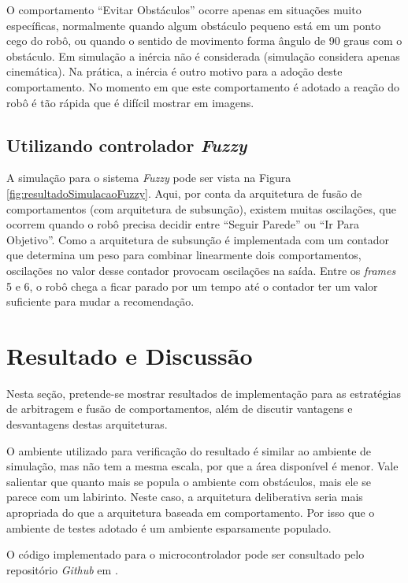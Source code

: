	O comportamento ``Evitar Obstáculos'' ocorre apenas em situações muito específicas, normalmente quando algum 
	obstáculo pequeno está em um ponto cego do robô, ou quando o sentido de movimento forma ângulo de 90 graus com
	o obstáculo. Em simulação a inércia não é considerada (simulação considera apenas cinemática). Na prática, a 
	inércia é outro motivo para a adoção deste comportamento. No momento em que este comportamento é adotado
	a reação do robô é tão rápida que é difícil mostrar em imagens. 
	
	\subsection{Utilizando controlador \textit{Fuzzy}}
	
	A simulação para o sistema \textit{Fuzzy} pode ser vista na Figura \ref{fig:resultadoSimulacaoFuzzy}. 
	Aqui, por conta da arquitetura de fusão de comportamentos (com arquitetura de subsunção), existem muitas 
	oscilações, que ocorrem quando o robô precisa decidir entre ``Seguir Parede'' ou ``Ir Para Objetivo''. Como a 
	arquitetura de subsunção é implementada com um contador que determina um peso para combinar linearmente dois
	comportamentos, oscilações no valor desse contador provocam oscilações na saída. Entre os \textit{frames} 5 e 6, 
	o robô chega a ficar parado por um tempo até o contador ter um valor suficiente para mudar a recomendação. 
	
	
	
\section{Resultado e Discussão}

	Nesta seção, pretende-se mostrar resultados de implementação para as estratégias de 
	arbitragem e fusão de comportamentos, além de discutir vantagens e desvantagens destas 
	arquiteturas.
	
	O ambiente utilizado para verificação do resultado é similar ao ambiente de simulação, mas não tem a mesma
	escala, por que a área disponível é menor. Vale salientar que quanto mais se popula o ambiente com obstáculos,
	mais ele se parece com um labirinto. Neste caso, a arquitetura deliberativa seria mais apropriada do que a 
	arquitetura baseada em comportamento. Por isso que o ambiente de testes adotado é um ambiente esparsamente 
	populado.
	
	O código implementado para o microcontrolador pode ser consultado pelo repositório 
	\textit{Github} em .
	 
